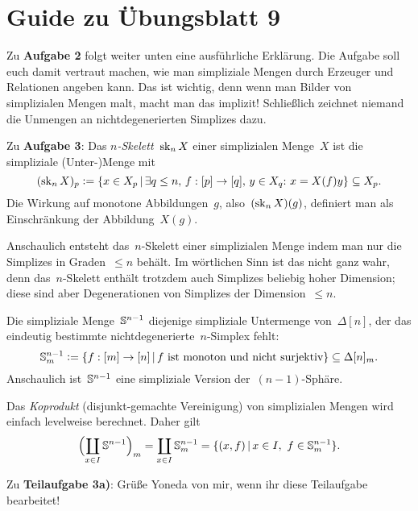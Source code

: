 \documentclass{uebblatt}
\begin{document}
\section*{Guide zu Übungsblatt 9}

Zu \textbf{Aufgabe 2} folgt weiter unten eine ausführliche Erklärung. Die
Aufgabe soll euch damit vertraut machen, wie man simpliziale Mengen durch
Erzeuger und Relationen angeben kann. Das ist wichtig, denn wenn man Bilder von
simplizialen Mengen malt, macht man das implizit! Schließlich zeichnet niemand
die Unmengen an nichtdegenerierten Simplizes dazu.

Zu \textbf{Aufgabe 3}: Das \emph{$n$-Skelett}~$\operatorname{sk}_n X$ einer simplizialen
Menge~$X$ ist die simpliziale (Unter-)Menge mit
\[ (\sk_n X)_p \defeq \{ x \in X_p \,|\,
  \exists q \leq n,\, f : [p] \to [q],\, y \in X_q{:}\ 
  x = X(f)y \} \subseteq X_p. \]
Die Wirkung auf monotone Abbildungen~$g$, also~$(\operatorname{sk}_n X)(g)$, definiert man als
Einschränkung der Abbildung~$X(g)$.

Anschaulich entsteht das~$n$-Skelett einer simplizialen Menge indem man nur die
Simplizes in Graden~$\leq n$ behält. Im wörtlichen Sinn ist das nicht ganz
wahr, denn das~$n$-Skelett enthält trotzdem auch Simplizes beliebig hoher
Dimension; diese sind aber Degenerationen von Simplizes der Dimension~$\leq n$.

Die simpliziale Menge~$\mathbb{S}^{n-1}$ diejenige simpliziale Untermenge
von~$\Delta[n]$, der das eindeutig bestimmte nichtdegenerierte~$n$-Simplex
fehlt:
\[ \mathbb{S}^{n-1}_m \vcentcolon= \{ f : [m] \to [n] \,|\,
  \text{$f$ ist monoton und nicht surjektiv} \} \subseteq \Delta[n]_m. \]
Anschaulich ist~$\mathbb{S}^{n-1}$ eine simpliziale Version der~$(n-1)$-Sphäre.

Das \emph{Koprodukt} (disjunkt-gemachte Vereinigung) von simplizialen Mengen
wird einfach levelweise berechnet. Daher gilt
\[ \Bigl(\coprod_{x \in I} \mathbb{S}^{n-1}\Bigr)_m =
  \coprod_{x \in I} \mathbb{S}^{n-1}_m =
  \{ (x, f) \,|\, x \in I,\ f \in \mathbb{S}^{n-1}_m \}. \]

Zu \textbf{Teilaufgabe 3a)}: Grüße Yoneda von mir, wenn ihr diese Teilaufgabe
bearbeitet!
\end{document}

